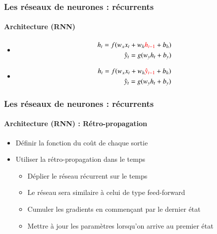 \documentclass[xcolor=table]{beamer}
\begin{document}
\begin{frame}
\frametitle{Les réseaux de neurones : récurrents}
\framesubtitle{Architecture (RNN)}

\begin{minipage}{0.49\textwidth} 
	\begin{itemize}
		\item {}
		\begin{align*}
		h_t = f(w_x x_t + w_h \textcolor{red}{h_{t-1}} + b_h) \\
		\hat{y}_t = g(w_y h_t + b_y)
		\end{align*}
		\item {}
		\begin{align*}
		h_t = f(w_x x_t + w_h \textcolor{red}{\hat{y}_{t-1}} + b_h) \\
		\hat{y}_t = g(w_y h_t + b_y)
		\end{align*}
	\end{itemize}
\end{minipage}
%
\begin{minipage}{0.5\textwidth}
\end{minipage}

\end{frame}

\begin{frame}
\frametitle{Les réseaux de neurones : récurrents}
\framesubtitle{Architecture (RNN) : Rétro-propagation}

\begin{itemize}
	\item Définir la fonction du coût de chaque sortie
	\item Utiliser la rétro-propagation dans le temps \cite{1990-werbos}  
	\begin{itemize}
		\item Déplier le réseau récurrent sur le temps 
		\item Le réseau sera similaire à celui de type feed-forward 
		\item Cumuler les gradients en commençant par le dernier état 
		\item Mettre à jour les paramètres lorsqu'on arrive au premier état
	\end{itemize}
\end{itemize}


\end{frame}
\end{document}
